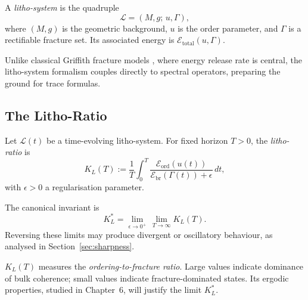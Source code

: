 \begin{definition}
A \emph{litho-system} is the quadruple
\[
\mathcal{L} = (M,g;\, u, \Gamma),
\]
where $(M,g)$ is the geometric background, $u$ is the order parameter,
and $\Gamma$ is a rectifiable fracture set. Its associated energy is
$\mathcal{E}_{\mathrm{total}}(u,\Gamma)$.
\end{definition}

\begin{remark}
Unlike classical Griffith fracture models \cite{griffith1921phenomena},
where energy release rate is central, the litho-system formalism
couples directly to spectral operators, preparing the ground for
trace formulas.
\end{remark}

\bigskip


\subsection{The Litho-Ratio}

\begin{definition}
Let $\mathcal{L}(t)$ be a time-evolving litho-system. For fixed horizon $T>0$,
the \emph{litho-ratio} is
\[
K_L(T) := \frac{1}{T}\int_0^T
\frac{\mathcal{E}_{\mathrm{ord}}(u(t))}
{\mathcal{E}_{\mathrm{br}}(\Gamma(t)) + \epsilon} \, dt,
\]
with $\epsilon>0$ a regularisation parameter.
\end{definition}

\begin{remark}
The canonical invariant is
\[
K_L^* = \lim_{\epsilon \to 0^+}\,\lim_{T\to\infty} K_L(T).
\]
Reversing these limits may produce divergent or oscillatory behaviour,
as analysed in Section~\ref{sec:sharpness}.
\end{remark}

\begin{remark}
$K_L(T)$ measures the \emph{ordering-to-fracture ratio}. Large values
indicate dominance of bulk coherence; small values indicate fracture-dominated
states. Its ergodic properties, studied in Chapter~6, will justify the limit $K_L^*$.
\end{remark}


